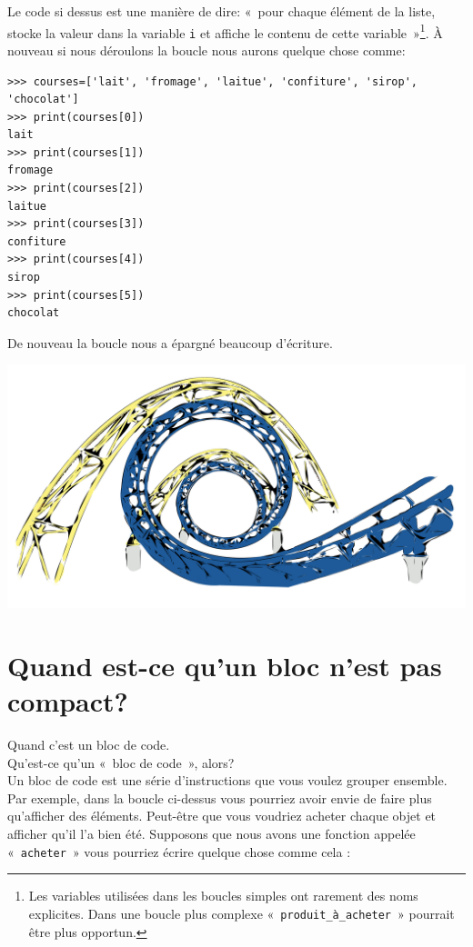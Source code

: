 Le code si dessus est une manière de dire: « pour chaque élément de la liste, stocke la valeur dans la variable \texttt{i} et affiche le contenu de cette variable »\footnote{Les variables utilisées dans les boucles simples ont rarement des noms explicites. Dans une boucle plus complexe « \texttt{produit\_à\_acheter} » pourrait être plus opportun.}.  À nouveau si nous déroulons la boucle nous aurons quelque chose comme:

\begin{small}
\begin{Verbatim}[frame=single,rulecolor=\color{gray}, label=ne pas saisir]
>>> courses=['lait', 'fromage', 'laitue', 'confiture', 'sirop', 'chocolat']
>>> print(courses[0])
lait
>>> print(courses[1])
fromage
>>> print(courses[2])
laitue
>>> print(courses[3])
confiture
>>> print(courses[4])
sirop
>>> print(courses[5])
chocolat
\end{Verbatim}
\end{small}

De nouveau la boucle nous a épargné beaucoup d'écriture.

\begin{center}
\includegraphics[scale=.2]{images/SteveLambert_Roller_Coaster_Tracks.pdf} 
\end{center}


\section{Quand est-ce qu'un bloc n'est pas compact?}
Quand c'est un bloc de code.\\

Qu'est-ce qu'un « bloc de code », alors?\\

Un bloc de code est une série d'instructions que vous voulez grouper ensemble.
Par exemple, dans la boucle ci-dessus vous pourriez avoir envie de faire plus qu'afficher des éléments. 
Peut-être que vous voudriez acheter chaque objet et afficher qu'il l'a bien été.
Supposons que nous avons une fonction appelée « \texttt{acheter} » vous pourriez écrire quelque chose comme cela :

